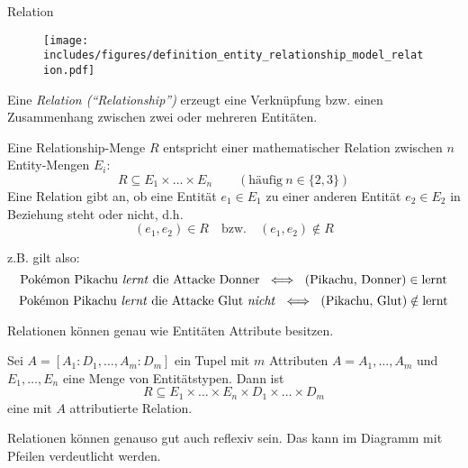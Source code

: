 \begin{defi}{Relation}
    \begin{wrapfigure}{r}{0.25\textwidth}
        \begin{center}
            \texttt{[image: includes/figures/definition\_entity\_relationship\_model\_relation.pdf]}
        \end{center}
    \end{wrapfigure}
    Eine \emph{Relation (\enquote{Relationship})} erzeugt eine Verknüpfung bzw. einen Zusammenhang zwischen zwei oder mehreren Entitäten.

    Eine Relationship-Menge $R$ entspricht einer mathematischer Relation zwischen $n$ Entity-Mengen $E_i$:
    \[
        R \subseteq E_1 \times \ldots \times E_n \qquad (\text{häufig} \ n \in \{2, 3\})
    \]
    Eine Relation gibt an, ob eine Entität $e_1 \in E_1$ zu einer anderen Entität $e_2 \in E_2$ in Beziehung steht oder nicht, d.h.
    \[
        (e_1, e_2) \in R \quad \text{bzw.} \quad (e_1, e_2) \notin R
    \]

    z.B. gilt also:
    \[
        \text{Pokémon Pikachu \emph{lernt} die Attacke Donner} \ \iff \ (\text{Pikachu}, \, \text{Donner}) \in \text{lernt}
    \]
    \[
        \text{Pokémon Pikachu \emph{lernt} die Attacke Glut \emph{nicht}} \ \iff \ (\text{Pikachu}, \, \text{Glut}) \notin \text{lernt}
    \]

    Relationen können genau wie Entitäten Attribute besitzen.

    Sei $A = [A_1 : D_1, \ldots, A_m : D_m]$ ein Tupel mit $m$ Attributen $A = A_1, \ldots, A_m$ und $E_1, \ldots, E_n$ eine Menge von Entitätstypen.
    Dann ist
    \[
        R \subseteq E_1 \times \ldots \times E_n \times D_1 \times \ldots \times D_m
    \]
    eine mit $A$ attributierte Relation.

    Relationen können genauso gut auch reflexiv sein.
    Das kann im Diagramm mit Pfeilen verdeutlicht werden.
\end{defi}

